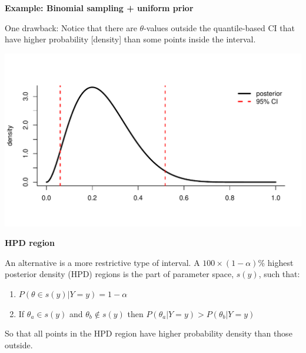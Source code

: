 \documentclass[12pt,xcolor=svgnames]{beamer}
\newcommand{\theme}{\color{FireBrick}}
\newcommand{\sk}{\vspace{.4cm}}
\newcommand{\chap}[1]{{\theme \Large \bf #1} \sk}
\begin{document}
\begin{frame}[fragile]
\chap{Example: Binomial sampling + uniform prior}

One drawback: Notice that there are $\theta$-values outside the quantile-based CI that have higher probability [density] than some points inside the interval.

\begin{center}
\includegraphics[scale=0.5,trim=30 50 0 50]{quantCI}
\end{center}

\end{frame}


\begin{frame}
\chap{HPD region}

An alternative is a more restrictive type of interval. A $100 \times(1-\alpha)$\% highest posterior density (HPD) regions is the part of parameter space, $s(y)$, such that:
\begin{enumerate}
\item $P(\theta \in s(y) |Y=y)= 1-\alpha$
\item If $\theta_a \in s(y)$ and $\theta_b \notin s(y)$ then $P(\theta_a |Y=y)>P(\theta_b |Y=y)$
\end{enumerate}
So that all points in the HPD region have higher probability density than those outside.

\end{frame}
\end{document}
